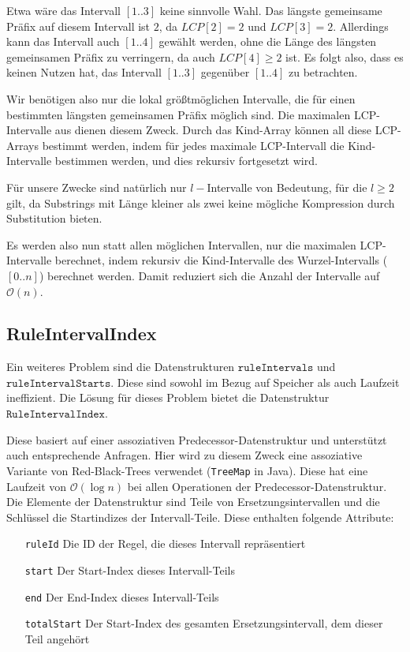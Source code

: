 Etwa wäre das Intervall $[1..3]$ keine sinnvolle Wahl. Das längste gemeinsame Präfix auf diesem Intervall ist $2$, da $LCP[2] = 2$ und $LCP[3] = 2$. Allerdings kann das Intervall auch $[1..4]$ gewählt werden, ohne die Länge des längsten gemeinsamen Präfix zu verringern, da auch $LCP[4] \geq 2$ ist. 
Es folgt also, dass es keinen Nutzen hat, das Intervall $[1..3]$ gegenüber $[1..4]$ zu betrachten.

Wir benötigen also nur die lokal größtmöglichen Intervalle, die für einen bestimmten längsten gemeinsamen Präfix möglich sind. Die maximalen LCP-Intervalle aus \cite{abouelhoda_optimal_2002} dienen diesem Zweck. Durch das Kind-Array können all diese LCP-Arrays bestimmt werden, indem für jedes maximale LCP-Intervall die Kind-Intervalle bestimmen werden, und dies rekursiv fortgesetzt wird.

Für unsere Zwecke sind natürlich nur $l-$Intervalle von Bedeutung, für die $l \geq 2$ gilt, da Substrings mit Länge kleiner als zwei keine mögliche Kompression durch Substitution bieten.

Es werden also nun statt allen möglichen Intervallen, nur die maximalen LCP-Intervalle berechnet, indem rekursiv die Kind-Intervalle des Wurzel-Intervalls ($[0..n]$) berechnet werden. Damit reduziert sich die Anzahl der Intervalle auf $\mathcal{O}(n)$.

\subsection{RuleIntervalIndex}

Ein weiteres Problem sind die Datenstrukturen $\texttt{ruleIntervals}$ und $\texttt{ruleIntervalStarts}$. Diese sind sowohl im Bezug auf Speicher als auch Laufzeit ineffizient. Die Lösung für dieses Problem bietet die Datenstruktur $\texttt{RuleIntervalIndex}$.

Diese basiert auf einer assoziativen Predecessor-Datenstruktur \cite{dinklage_engineering_2021} und unterstützt auch entsprechende Anfragen. Hier wird zu diesem Zweck eine assoziative Variante von Red-Black-Trees \cite{bayer_symmetric_1972, guibas_dichromatic_1978} verwendet (\texttt{TreeMap} in Java). Diese hat eine Laufzeit von $\mathcal{O}(\log n)$ bei allen Operationen der Predecessor-Datenstruktur. Die Elemente der Datenstruktur sind Teile von Ersetzungsintervallen und die Schlüssel die Startindizes der Intervall-Teile. Diese enthalten folgende Attribute:
\begin{itemize}[leftmargin=2.5cm]
	\item[\texttt{ruleId}] Die ID der Regel, die dieses Intervall repräsentiert
	\item[\texttt{start}] Der Start-Index dieses Intervall-Teils
	\item[\texttt{end}] Der End-Index dieses Intervall-Teils
	\item[\texttt{totalStart}] Der Start-Index des gesamten Ersetzungsintervall, dem dieser Teil angehört
\end{itemize}


